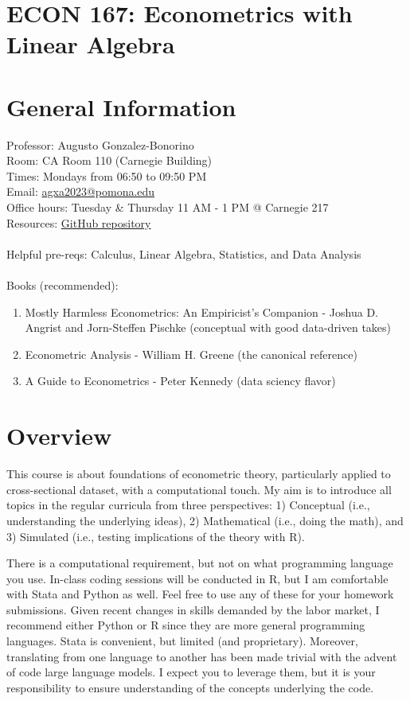 \documentclass[10pt]{article}
\begin{document}
\section*{ECON 167: Econometrics with Linear Algebra}

\section*{General Information}
Professor: Augusto Gonzalez-Bonorino\\
Room: CA Room 110 (Carnegie Building)\\
Times: Mondays from 06:50 to 09:50 PM\\
Email: \href{mailto:agxa2023@pomona.edu}{agxa2023@pomona.edu}\\
Office hours: Tuesday \& Thursday 11 AM - 1 PM @ Carnegie 217 \\
Resources: \href{https://github.com/Bonorinoa/ECON-167}{GitHub repository}
\\\\
Helpful pre-reqs: Calculus, Linear Algebra, Statistics, and Data Analysis
\\\\
Books (recommended):

\begin{enumerate}
  \item Mostly Harmless Econometrics: An Empiricist's Companion - Joshua D. Angrist and Jorn-Steffen Pischke (conceptual with good data-driven takes)
  \item Econometric Analysis - William H. Greene (the canonical reference)
  \item A Guide to Econometrics - Peter Kennedy (data sciency flavor)
\end{enumerate}

\section*{Overview}
This course is about foundations of econometric theory, particularly applied to cross-sectional dataset, with a computational touch. My aim is to introduce all topics in the regular curricula from three perspectives: 1) Conceptual (i.e., understanding the underlying ideas), 2) Mathematical (i.e., doing the math), and 3) Simulated (i.e., testing implications of the theory with R).

There is a computational requirement, but not on what programming language you use. In-class coding sessions will be conducted in R, but I am comfortable with Stata and Python as well. Feel free to use any of these for your homework submissions. Given recent changes in skills demanded by the labor market, I recommend either Python or R since they are more general programming languages. Stata is convenient, but limited (and proprietary). Moreover, translating from one language to another has been made trivial with the advent of code large language models. I expect you to leverage them, but it is your responsibility to ensure understanding of the concepts underlying the code. 
\end{document}

